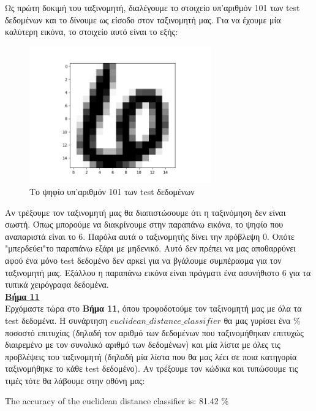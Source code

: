 \documentclass[11pt]{article} %
\begin{document}
Ως πρώτη δοκιμή του ταξινομητή, διαλέγουμε το στοιχείο υπ'αριθμόν 101 των test δεδομένων και το δίνουμε ως είσοδο στον ταξινομητή μας. Για να έχουμε μία καλύτερη εικόνα, το στοιχείο αυτό είναι το εξής:


\begin{figure}[H]
    \centering
    \includegraphics[width=0.7\textwidth]{plots/figure_101}
    \caption{Το ψηφίο υπ'αριθμόν 101 των test δεδομένων}
    \label{fig:101}
\end{figure}

Αν τρέξουμε τον ταξινομητή μας θα διαπιστώσουμε ότι η ταξινόμηση δεν είναι σωστή. Όπως μπορούμε να διακρίνουμε στην παραπάνω εικόνα, το ψηφίο που αναπαριστά είναι το $6$. Παρόλα αυτά ο ταξινομητής δίνει την πρόβλεψη $0$. Οπότε "μπερδεύει"το παραπάνω εξάρι με μηδενικό. Αυτό δεν πρέπει να μας αποθαρρύνει αφού ένα μόνο test δεδομένο δεν αρκεί για να βγάλουμε συμπέρασμα για τον ταξινομητή μας. Εξάλλου η παραπάνω εικόνα είναι πράγματι ένα ασυνήθιστο $6$ για τα τυπικά χειρόγραφα δεδομένα.\\


\underline{\textbf{Βήμα 11}}\\

Ερχόμαστε τώρα στο \textbf{Βήμα 11}, όπου τροφοδοτούμε τον ταξινομητή μας με όλα τα test δεδομένα. Η συνάρτηση $euclidean\_distance\_classifier$ θα μας γυρίσει ένα \% ποσοστό επιτυχίας (δηλαδή τον αριθμό των δεδομένων που ταξινομήθηκαν επιτυχώς διαιρεμένο με τον συνολικό αριθμό των δεδομένων) και μία λίστα με όλες τις προβλέψεις του ταξινομητή (δηλαδή μία λίστα που θα μας λέει σε ποια κατηγορία ταξινομήθηκε το κάθε test δεδομένο). Αν τρέξουμε τον κώδικα και τυπώσουμε τις τιμές τότε θα λάβουμε στην οθόνη μας:

\begin{center}
The accuracy of the euclidean distance classifier is: 81.42 \%
\end{center}
\end{document}
